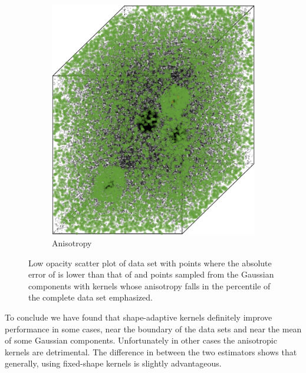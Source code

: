 \begin{figure}[b!]
\begin{subfigure}{0.23\textwidth}
					\includegraphics[keepaspectratio=true, width=\textwidth, height=0.23\textheight]{discussion/img/ferdosi_3_more_noise_anisotropy.png}
					\caption{Anisotropy}
					\label{fig:discussion:ferdosi3Noise:anisotropy}
				\end{subfigure}
				\caption{Low opacity scatter plot of data set \ferdosiThreeNoise with %
					 points where the absolute error of \mbe is lower than that of \sambe and %
					 points sampled from the Gaussian components with kernels whose anisotropy falls in the  percentile of the complete data set emphasized.}
				\label{fig:discussion:ferdosi3Noise}
			\end{figure}

To conclude we have found that shape-adaptive kernels definitely improve performance in some cases, \ie near the boundary of the data sets and near the mean of some Gaussian components. Unfortunately in other cases the anisotropic kernels are detrimental. The difference in \mse between the two estimators shows that generally, using fixed-shape kernels is slightly advantageous.
